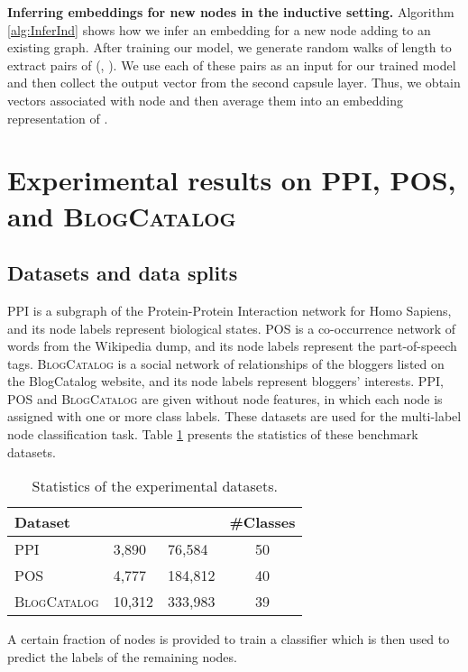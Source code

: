 \documentclass[sigconf]{acmart}
\begin{document}
\textbf{Inferring embeddings for new nodes in the inductive setting.}
Algorithm \ref{alg:InferInd} shows how we infer an embedding for a new node  adding to an existing graph. 
After training our model, we generate random walks of length  to extract  pairs of (, ).
We use each of these pairs as an input for our trained model and then collect the output vector  from the second capsule layer.
Thus, we obtain  vectors associated with node  and then average them into an embedding representation of .

\section{Experimental results on PPI, POS, and \textsc{BlogCatalog}}

\subsection{Datasets and data splits}

PPI \citep{BioGRID:2008} is a subgraph of the Protein-Protein Interaction network for Homo Sapiens, and its node labels represent biological states. POS \citep{mahoney2011large} is a co-occurrence network of words from the Wikipedia dump, and its node labels represent the part-of-speech tags. \textsc{BlogCatalog} \citep{ZafaraniLiu:2009} is a social network of relationships of the bloggers listed on the BlogCatalog website, and its node labels represent bloggers' interests.  {PPI, POS} and \textsc{BlogCatalog} are given without node features, in which each node is assigned with one or more class labels. These datasets are used for the multi-label node classification task.
Table \ref{tab:graphdatasets_pos} presents the statistics of these benchmark datasets.

\begin{table}[!ht]
\centering
\caption{Statistics of the experimental datasets.}
\def\arraystretch{1.1}
\begin{tabular}{l|llc}
\hline
\bf Dataset &  \bf{} & \bf{} & {\#Classes}\\
\hline
PPI & 3,890 & 76,584 & 50 \\
POS & 4,777 & 184,812 & 40 \\
\textsc{BlogCatalog} & 10,312 & 333,983 & 39\\
\hline
\end{tabular}
\label{tab:graphdatasets_pos}
\end{table}

A certain fraction  of nodes is provided to train a classifier which is then used to predict the labels of the remaining nodes.
\end{document}
